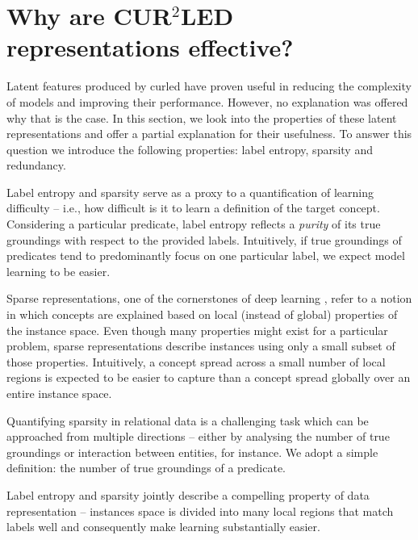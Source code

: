 



\section{Why are CUR$^2$LED representations effective?}


Latent features produced by \gls{curled} have proven useful in reducing the complexity of models and improving their performance.
However, no explanation was offered why that is the case.
In this section, we look into the properties of these latent representations and offer a partial explanation for their usefulness.
To answer this question we introduce the following properties: label entropy, sparsity and redundancy.



Label entropy and sparsity serve as a proxy to a quantification of learning difficulty -- i.e., how difficult is it to learn a definition of the target concept.
Considering a particular predicate, label entropy reflects a \textit{purity} of its true groundings with respect to the provided labels.
Intuitively, if true groundings of predicates tend to predominantly focus on one particular label, we expect model learning to be easier.


Sparse representations, one of the cornerstones of deep learning \cite{Bengio2013RLR}, refer to a notion in which concepts are explained based on local (instead of global) properties of the instance space.
Even though many properties might exist for a particular problem, sparse representations describe instances using only a small subset of those properties.
Intuitively, a concept spread across a small number of local regions is expected to be easier to capture than a concept spread globally over an entire instance space.



Quantifying sparsity in relational data is a challenging task which can be approached from multiple directions -- either by analysing the number of true groundings or interaction between entities, for instance.
We adopt a simple definition: the number of true groundings of a predicate.


Label entropy and sparsity jointly describe a compelling property of data representation --  instances space is divided into many local regions that match labels well  and consequently make learning substantially easier.



